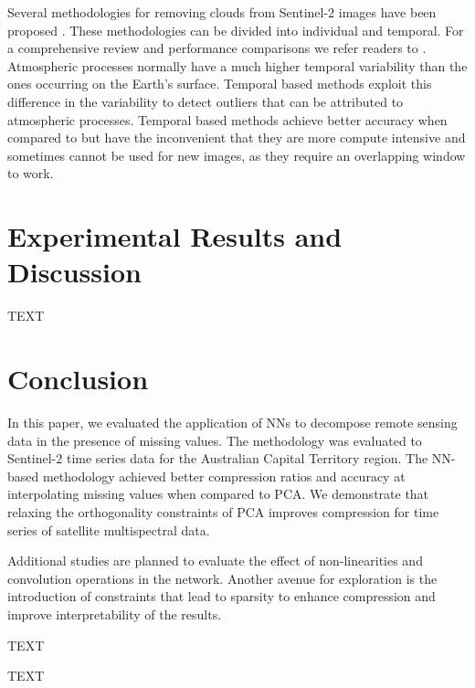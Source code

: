 \documentclass[essd, manuscript]{copernicus}
\begin{document}
Several methodologies for removing clouds from Sentinel-2 images have been proposed \citep{}. These methodologies can be divided into individual and temporal. For a comprehensive review and performance comparisons we refer readers to \citep{}. Atmospheric processes normally have a much higher temporal variability than the ones occurring on the Earth's surface. Temporal based methods exploit this difference in the variability to detect outliers that can be attributed to atmospheric processes. Temporal based methods achieve better accuracy when compared to but have the inconvenient that they are more compute intensive and sometimes cannot be used for new images, as they require an overlapping window to work. 



\section{Experimental Results and Discussion}
TEXT


\section{Conclusion}
In this paper, we evaluated the application of NNs to decompose remote sensing data in the presence of missing values. The methodology was evaluated to Sentinel-2 time series data for the Australian Capital Territory region. The NN-based methodology achieved better compression ratios and accuracy at interpolating missing values when compared to PCA. We demonstrate that relaxing the orthogonality constraints of PCA improves compression for time series of satellite multispectral data.

Additional studies are planned to evaluate the effect of non-linearities and convolution operations in the network. Another avenue for exploration is the introduction of constraints that lead to sparsity to enhance compression and improve interpretability of the results. 

TEXT

\conclusions  %
TEXT


\end{document}
